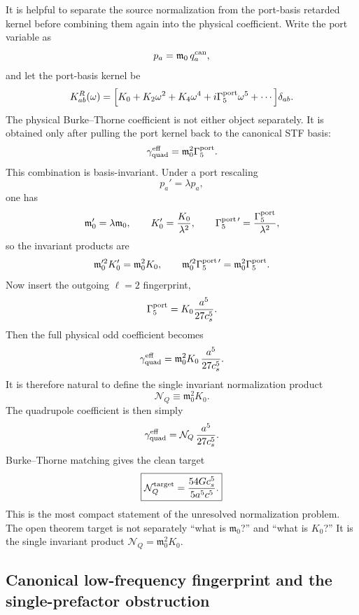 \documentclass[11pt]{article}
\begin{document}
It is helpful to separate the source normalization from the port-basis retarded
kernel before combining them again into the physical coefficient.  Write the
port variable as
\[
p_a=\mathfrak m_0\,q_a^{\rm can},
\]
and let the port-basis kernel be
\[
K_{ab}^R(\omega)
=
\Bigl[K_0+K_2\omega^2+K_4\omega^4+i\Gamma_5^{\rm port}\omega^5+\cdots\Bigr]\delta_{ab}.
\]
The physical Burke--Thorne coefficient is not either object separately.  It is
obtained only after pulling the port kernel back to the canonical STF basis:
\[
\gamma_{\rm quad}^{\rm eff}=\mathfrak m_0^2\Gamma_5^{\rm port}.
\]
This combination is basis-invariant.  Under a port rescaling
\[
p_a'=\lambda p_a,
\]
one has
\[
\mathfrak m_0'=\lambda\mathfrak m_0,
\qquad
K_0'=\frac{K_0}{\lambda^2},
\qquad
\Gamma_5^{\rm port\,\prime}=\frac{\Gamma_5^{\rm port}}{\lambda^2},
\]
so the invariant products are
\[
\mathfrak m_0'^2K_0'=\mathfrak m_0^2K_0,
\qquad
\mathfrak m_0'^2\Gamma_5^{\rm port\,\prime}
=
\mathfrak m_0^2\Gamma_5^{\rm port}.
\]
Now insert the outgoing $\ell=2$ fingerprint,
\[
\Gamma_5^{\rm port}=K_0\frac{a^5}{27c_s^5}.
\]
Then the full physical odd coefficient becomes
\[
\gamma_{\rm quad}^{\rm eff}
=
\mathfrak m_0^2K_0\,\frac{a^5}{27c_s^5}.
\]
It is therefore natural to define the single invariant normalization product
\begin{equation}
\boxed{
\mathcal N_Q\equiv \mathfrak m_0^2K_0.
}
\label{eq:qnorm-invariant-NQ}
\end{equation}
The quadrupole coefficient is then simply
\[
\gamma_{\rm quad}^{\rm eff}=\mathcal N_Q\,\frac{a^5}{27c_s^5}.
\]
Burke--Thorne matching gives the clean target
\begin{equation}
\boxed{
\mathcal N_Q^{\rm target}=\frac{54Gc_s^5}{5a^5c^5}.
}
\label{eq:qnorm-NQ-target}
\end{equation}
This is the most compact statement of the unresolved normalization problem.  The
open theorem target is not separately ``what is $\mathfrak m_0$?'' and ``what is
$K_0$?''  It is the single invariant product
\(\mathcal N_Q=\mathfrak m_0^2K_0\).

\subsection{Canonical low-frequency fingerprint and the single-prefactor obstruction}
\label{app:qnorm-canonical-fingerprint}
\end{document}
